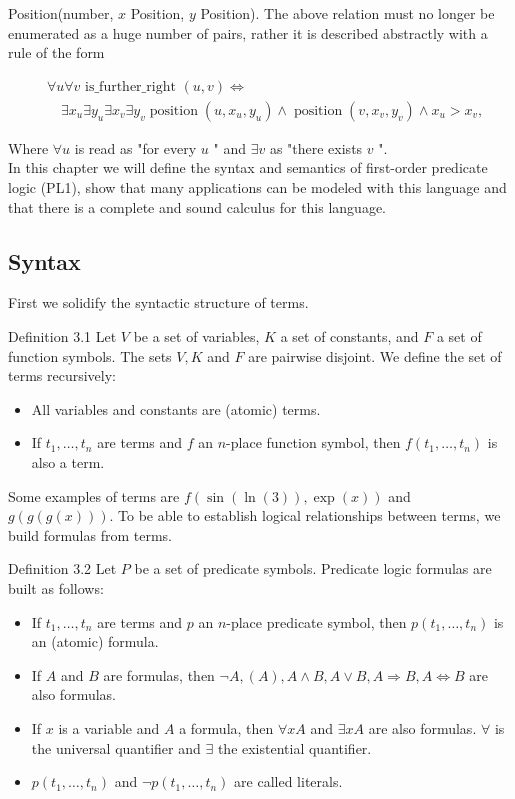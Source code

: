 \documentclass[10pt]{article}
\begin{document}
Position(number, $x$ Position, $y$ Position). The above relation must no longer be enumerated as a huge number of pairs, rather it is described abstractly with a rule of the form

$$
\begin{aligned}
& \forall u \forall v \text { is_further_right }(u, v) \Leftrightarrow \\
& \quad \exists x_{u} \exists y_{u} \exists x_{v} \exists y_{v} \operatorname{position}\left(u, x_{u}, y_{u}\right) \wedge \operatorname{position}\left(v, x_{v}, y_{v}\right) \wedge x_{u}>x_{v},
\end{aligned}
$$

Where $\forall u$ is read as "for every $u$ " and $\exists v$ as "there exists $v$ ".\\
In this chapter we will define the syntax and semantics of first-order predicate logic (PL1), show that many applications can be modeled with this language and that there is a complete and sound calculus for this language.

\subsection*{Syntax}
First we solidify the syntactic structure of terms.

Definition 3.1 Let $V$ be a set of variables, $K$ a set of constants, and $F$ a set of function symbols. The sets $V, K$ and $F$ are pairwise disjoint. We define the set of terms recursively:

\begin{itemize}
  \item All variables and constants are (atomic) terms.
  \item If $t_{1}, \ldots, t_{n}$ are terms and $f$ an $n$-place function symbol, then $f\left(t_{1}, \ldots, t_{n}\right)$ is also a term.
\end{itemize}

Some examples of terms are $f(\sin (\ln (3)), \exp (x))$ and $g(g(g(x)))$. To be able to establish logical relationships between terms, we build formulas from terms.

Definition 3.2 Let $P$ be a set of predicate symbols. Predicate logic formulas are built as follows:

\begin{itemize}
  \item If $t_{1}, \ldots, t_{n}$ are terms and $p$ an $n$-place predicate symbol, then $p\left(t_{1}, \ldots, t_{n}\right)$ is an (atomic) formula.
  \item If $A$ and $B$ are formulas, then $\neg A,(A), A \wedge B, A \vee B, A \Rightarrow B, A \Leftrightarrow B$ are also formulas.
  \item If $x$ is a variable and $A$ a formula, then $\forall x A$ and $\exists x A$ are also formulas. $\forall$ is the universal quantifier and $\exists$ the existential quantifier.
  \item $p\left(t_{1}, \ldots, t_{n}\right)$ and $\neg p\left(t_{1}, \ldots, t_{n}\right)$ are called literals.
\end{itemize}
\end{document}
